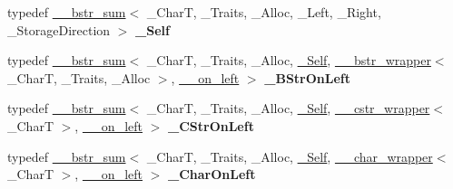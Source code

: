 \begin{DoxyCompactItemize}
\mbox{\label{class____bstr__sum_aa9b23135e659a92193c7a44177625c97}} 
typedef \hyperlink{class____bstr__sum}{\+\_\+\+\_\+bstr\+\_\+sum}$<$ \+\_\+\+CharT, \+\_\+\+Traits, \+\_\+\+Alloc, \+\_\+\+Left, \+\_\+\+Right, \+\_\+\+Storage\+Direction $>$ {\bfseries \+\_\+\+Self}
\item 
\mbox{\label{class____bstr__sum_a5f56b1d42a9a4849a4ba45c86ae304fd}} 
typedef \hyperlink{class____bstr__sum}{\+\_\+\+\_\+bstr\+\_\+sum}$<$ \+\_\+\+CharT, \+\_\+\+Traits, \+\_\+\+Alloc, \hyperlink{class____bstr__sum}{\+\_\+\+Self}, \hyperlink{struct____bstr__wrapper}{\+\_\+\+\_\+bstr\+\_\+wrapper}$<$ \+\_\+\+CharT, \+\_\+\+Traits, \+\_\+\+Alloc $>$, \hyperlink{struct____on__left}{\+\_\+\+\_\+on\+\_\+left} $>$ {\bfseries \+\_\+\+B\+Str\+On\+Left}
\item 
\mbox{\label{class____bstr__sum_a21d61ea72792f279df7a6e668c68f4be}} 
typedef \hyperlink{class____bstr__sum}{\+\_\+\+\_\+bstr\+\_\+sum}$<$ \+\_\+\+CharT, \+\_\+\+Traits, \+\_\+\+Alloc, \hyperlink{class____bstr__sum}{\+\_\+\+Self}, \hyperlink{struct____cstr__wrapper}{\+\_\+\+\_\+cstr\+\_\+wrapper}$<$ \+\_\+\+CharT $>$, \hyperlink{struct____on__left}{\+\_\+\+\_\+on\+\_\+left} $>$ {\bfseries \+\_\+\+C\+Str\+On\+Left}
\item 
\mbox{\label{class____bstr__sum_aa6df248182ac9e943a41a72afbb6f3cc}} 
typedef \hyperlink{class____bstr__sum}{\+\_\+\+\_\+bstr\+\_\+sum}$<$ \+\_\+\+CharT, \+\_\+\+Traits, \+\_\+\+Alloc, \hyperlink{class____bstr__sum}{\+\_\+\+Self}, \hyperlink{struct____char__wrapper}{\+\_\+\+\_\+char\+\_\+wrapper}$<$ \+\_\+\+CharT $>$, \hyperlink{struct____on__left}{\+\_\+\+\_\+on\+\_\+left} $>$ {\bfseries \+\_\+\+Char\+On\+Left}
\end{DoxyCompactItemize}
